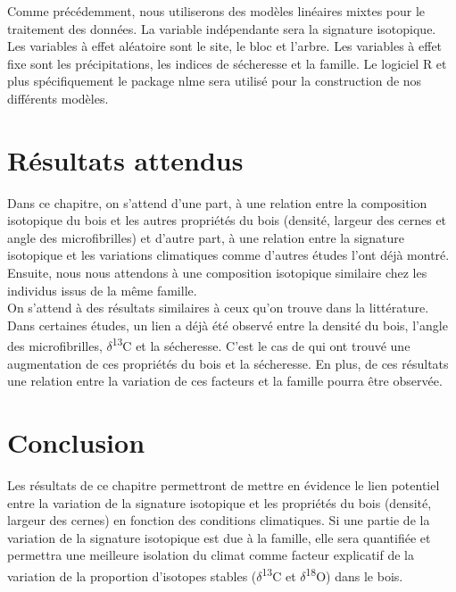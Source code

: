 \documentclass[a4paper,12pt]{report}
\newcommand{\Ctreize}{$\delta$\textsuperscript{13}C\xspace}
\newcommand{\Odixhuit}{$\delta$\textsuperscript{18}O\xspace}
\begin{document}
Comme précédemment, nous utiliserons des modèles linéaires mixtes pour le traitement des données. La variable indépendante sera la signature isotopique. Les variables à effet aléatoire sont le site, le bloc et l'arbre. Les variables à effet fixe sont les précipitations, les indices de sécheresse et la famille. Le logiciel R et plus spécifiquement le package nlme sera utilisé pour la construction de nos différents modèles. 

\section{Résultats attendus}

Dans ce chapitre, on s'attend d'une part, à une relation entre la composition isotopique du bois et les autres propriétés du bois (densité, largeur des cernes et angle des microfibrilles) et d'autre part, à une relation entre la signature isotopique et les variations climatiques comme d'autres études l'ont déjà montré. Ensuite, nous nous attendons à une composition isotopique similaire chez les individus issus de la même famille.\\

On s'attend à des résultats similaires à ceux qu'on trouve dans la littérature. Dans certaines études, un lien a déjà été observé entre la densité du bois, l'angle des microfibrilles, \Ctreize et la sécheresse. C'est le cas de \cite{Drew2009} qui ont trouvé une augmentation de ces propriétés du bois et la sécheresse. En plus, de ces résultats une relation entre la variation de ces facteurs et la famille pourra être observée.  

\section{Conclusion}

Les résultats de ce chapitre permettront de mettre en évidence le lien potentiel entre la variation de la signature isotopique et les propriétés du bois (densité, largeur des cernes) en fonction des conditions climatiques. Si une partie de la variation de la signature isotopique est due à la famille, elle sera quantifiée et permettra une meilleure isolation du climat comme facteur explicatif de la variation de la proportion d'isotopes stables (\Ctreize et \Odixhuit) dans le bois.\\
\end{document}
